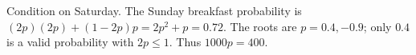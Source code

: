 Condition on Saturday. The Sunday breakfast probability is $(2p)(2p)+(1-2p)p=2p^2+p=0.72$. The roots are $p=0.4,-0.9$; only $0.4$ is a valid probability with $2p\le1$. Thus $\boxed{1000p=400}$.
